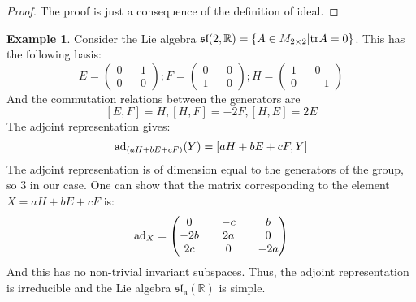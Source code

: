 \documentclass[12pt,a4paper]{report}
\theoremstyle{definition}
\theoremstyle{Theorem}
\theoremstyle{definition}
\newtheorem{Ex}[Def]{Example}
\theoremstyle{definition}
\begin{document}
	\begin{proof}
		The proof is just a consequence of the definition of ideal.			
	\end{proof}
	\begin{Ex}
		Consider the Lie algebra $\mathfrak{sl}(2,\mathbb{R})=\{A\in M_{2\times 2}|\hbox{tr} A=0\}$. This has the following basis:
		$$E=
		\begin{pmatrix}
			0 && 1\\
			0 && 0
		\end{pmatrix};
		F=
		\begin{pmatrix}
			0 && 0\\
			1 && 0
		\end{pmatrix};
		H=
		\begin{pmatrix}
			1 && 0\\
			0 && -1
		\end{pmatrix}$$
		And the commutation relations between the generators are 
		$$[E,F]=H, [H,F]=-2F,[H,E]=2E$$
		The adjoint representation gives:
		$$\hbox{ad}_{(aH+bE+cF)}(Y)=[aH+bE+cF,Y]$$
		The adjoint representation is of dimension equal to the generators of the group, so 3 in our case. One can show that the matrix corresponding to the element $X=aH+bE+cF$ is:
		$$\hbox{ad}_X=
		\begin{pmatrix}
			0 && -c && b \\
			-2b && 2a && 0 \\
			2c && 0 && -2a \\
		\end{pmatrix}$$
		And this has no non-trivial invariant subspaces. Thus, the adjoint representation is irreducible and the Lie algebra $\mathfrak{sl_n}(\mathbb{R})$ is simple.
	\end{Ex}
\end{document}
